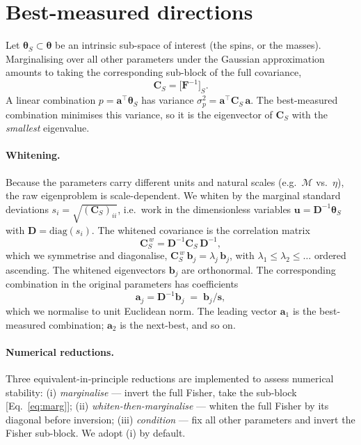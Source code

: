 \documentclass[11pt]{article}
\newcommand{\Mc}{\mathcal{M}}
\newcommand{\Fisher}{\bm{F}}
\newcommand{\Cov}{\bm{C}}
\newcommand{\vth}{\bm{\theta}}
\newcommand{\diag}{\mathrm{diag}}
\begin{document}
\section{Best-measured directions}
\label{sec:method}

Let $\vth_S \subset \vth$ be an intrinsic sub-space of interest (the spins, or
the masses). Marginalising over all other parameters under the Gaussian
approximation amounts to taking the corresponding sub-block of the full
covariance,
\begin{equation}
  \Cov_S = \bigl[\Fisher^{-1}\bigr]_{S}.
  \label{eq:marg}
\end{equation}
A linear combination $p = \bm{a}^{\!\top}\vth_S$ has variance
$\sigma_p^2 = \bm{a}^{\!\top}\Cov_S\,\bm{a}$. The best-measured combination
minimises this variance, so it is the eigenvector of $\Cov_S$ with the
\emph{smallest} eigenvalue.

\paragraph{Whitening.}
Because the parameters carry different units and natural scales (e.g.\ $\Mc$ vs.\
$\eta$), the raw eigenproblem is scale-dependent. We whiten by the marginal
standard deviations $s_i=\sqrt{(\Cov_S)_{ii}}$, i.e.\ work in the dimensionless
variables $\bm{u}=\bm{D}^{-1}\vth_S$ with $\bm{D}=\diag(s_i)$. The whitened
covariance is the correlation matrix
\begin{equation}
  \Cov_S^{\,w} = \bm{D}^{-1}\Cov_S\,\bm{D}^{-1},
\end{equation}
which we symmetrise and diagonalise,
$\Cov_S^{\,w}\,\bm{b}_j = \lambda_j\,\bm{b}_j$, with
$\lambda_1\le\lambda_2\le\dots$ ordered ascending. The whitened eigenvectors
$\bm{b}_j$ are orthonormal. The corresponding combination in the original
parameters has coefficients
\begin{equation}
  \bm{a}_j = \bm{D}^{-1}\bm{b}_j \;=\; \bm{b}_j / \bm{s},
  \label{eq:phys}
\end{equation}
which we normalise to unit Euclidean norm. The leading vector $\bm{a}_1$ is the
best-measured combination; $\bm{a}_2$ is the next-best, and so on.

\paragraph{Numerical reductions.}
Three equivalent-in-principle reductions are implemented to assess numerical
stability: (i) \emph{marginalise} --- invert the full Fisher, take the sub-block
[Eq.~\eqref{eq:marg}]; (ii) \emph{whiten-then-marginalise} --- whiten the full
Fisher by its diagonal before inversion; (iii) \emph{condition} --- fix all
other parameters and invert the Fisher sub-block. We adopt (i) by default.
\end{document}
